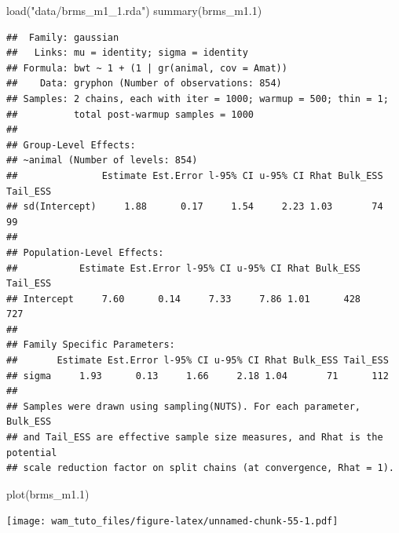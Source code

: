 \documentclass[
  12pt,
]{book}
\newenvironment{Shaded}{\begin{snugshade}}{\end{snugshade}}
\newcommand{\AttributeTok}[1]{\textcolor[rgb]{0.77,0.63,0.00}{#1}}
\newcommand{\ConstantTok}[1]{\textcolor[rgb]{0.00,0.00,0.00}{#1}}
\newcommand{\DecValTok}[1]{\textcolor[rgb]{0.00,0.00,0.81}{#1}}
\newcommand{\FloatTok}[1]{\textcolor[rgb]{0.00,0.00,0.81}{#1}}
\newcommand{\FunctionTok}[1]{\textcolor[rgb]{0.00,0.00,0.00}{#1}}
\newcommand{\NormalTok}[1]{#1}
\newcommand{\OtherTok}[1]{\textcolor[rgb]{0.56,0.35,0.01}{#1}}
\newcommand{\SpecialCharTok}[1]{\textcolor[rgb]{0.00,0.00,0.00}{#1}}
\newcommand{\StringTok}[1]{\textcolor[rgb]{0.31,0.60,0.02}{#1}}
\begin{document}
\begin{Shaded}
\begin{Highlighting}[]
\FunctionTok{load}\NormalTok{(}\StringTok{"data/brms\_m1\_1.rda"}\NormalTok{)}
\FunctionTok{summary}\NormalTok{(brms\_m1}\FloatTok{.1}\NormalTok{)}
\end{Highlighting}
\end{Shaded}

\begin{verbatim}
##  Family: gaussian 
##   Links: mu = identity; sigma = identity 
## Formula: bwt ~ 1 + (1 | gr(animal, cov = Amat)) 
##    Data: gryphon (Number of observations: 854) 
## Samples: 2 chains, each with iter = 1000; warmup = 500; thin = 1;
##          total post-warmup samples = 1000
## 
## Group-Level Effects: 
## ~animal (Number of levels: 854) 
##               Estimate Est.Error l-95% CI u-95% CI Rhat Bulk_ESS Tail_ESS
## sd(Intercept)     1.88      0.17     1.54     2.23 1.03       74       99
## 
## Population-Level Effects: 
##           Estimate Est.Error l-95% CI u-95% CI Rhat Bulk_ESS Tail_ESS
## Intercept     7.60      0.14     7.33     7.86 1.01      428      727
## 
## Family Specific Parameters: 
##       Estimate Est.Error l-95% CI u-95% CI Rhat Bulk_ESS Tail_ESS
## sigma     1.93      0.13     1.66     2.18 1.04       71      112
## 
## Samples were drawn using sampling(NUTS). For each parameter, Bulk_ESS
## and Tail_ESS are effective sample size measures, and Rhat is the potential
## scale reduction factor on split chains (at convergence, Rhat = 1).
\end{verbatim}

\begin{Shaded}
\begin{Highlighting}[]
\FunctionTok{plot}\NormalTok{(brms\_m1}\FloatTok{.1}\NormalTok{)}
\end{Highlighting}
\end{Shaded}

\texttt{[image: wam\_tuto\_files/figure-latex/unnamed-chunk-55-1.pdf]}

\begin{Shaded}
\end{Shaded}
\end{document}
